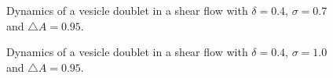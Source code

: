 \documentclass[%
preprint,
 amsmath,amssymb,
 aps,
]{revtex4-1}
\begin{document}

\begin{figure}
\caption{Dynamics of a vesicle doublet in a shear flow with $\delta = 0.4$, $\sigma = 0.7$ and $\triangle A=0.95$.}
\label{fig:sflow_1frames}
\end{figure}

\begin{figure}
\caption{Dynamics of a vesicle doublet in a shear flow with $\delta = 0.4$, $\sigma = 1.0$ and $\triangle A=0.95$.}
\label{fig:sflow_2frames}
\end{figure}

\end{document}
